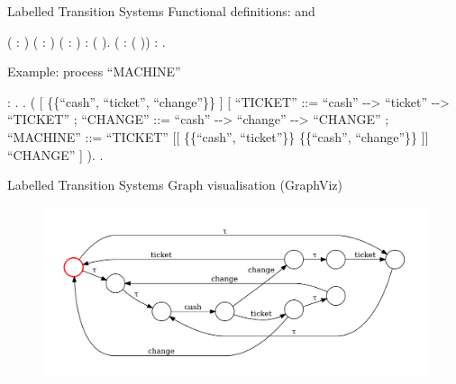 \documentclass[t]{beamer}
\begin{document}
\begin{frame}{Labelled Transition Systems}
	Functional definitions:  and 
	\vskip 0.1in
	\begin{coqdoccode}
		\scriptsize
		\coqdocnoindent
		 \coqdoceol
		\coqdocindent{1.00em}
		( : ) ( : ) ( : ) :  ( ).\coqdoceol
		\coqdocemptyline
		\coqdocnoindent
		  ( :  ( )) : .\coqdoceol
	\end{coqdoccode}
	\vskip 0.2in
	Example: process ``MACHINE''
	\vskip 0.1in
	\begin{coqdoccode}
		\scriptsize
		\coqdocnoindent
		  : .\coqdoceol
		\coqdocnoindent
		.\coqdoceol
		\coqdocindent{1.00em}
		 (\coqdoceol
		\coqdocindent{2.00em}
		\coqdoceol
		\coqdocindent{2.00em}
		[  \{\{``cash'', ``ticket'', ``change''\}\} ]\coqdoceol
		\coqdocindent{2.00em}
		[ ``TICKET'' ::= ``cash'' -{}-> ``ticket'' -{}->  ``TICKET''\coqdoceol
		\coqdocindent{2.00em}
		; ``CHANGE'' ::= ``cash'' -{}-> ``change'' -{}->  ``CHANGE''\coqdoceol
		\coqdocindent{2.00em}
		; ``MACHINE'' ::=  ``TICKET''\coqdoceol
		\coqdocindent{10.50em}[[ \{\{``cash'', ``ticket''\}\} \symbol{92} \{\{``cash'', ``change''\}\} ]]\coqdoceol
		\coqdocindent{10.50em} ``CHANGE'' ]\coqdoceol
		\coqdocindent{1.00em}
		).\coqdoceol
		\coqdocnoindent
		.\coqdoceol
	\end{coqdoccode}
\end{frame}

\begin{frame}{Labelled Transition Systems}
	Graph visualisation (GraphViz)
	\begin{figure}
		\includegraphics[scale=0.4]{figures/MACHINE_LTS.pdf}
	\end{figure}
\end{frame}
\end{document}
